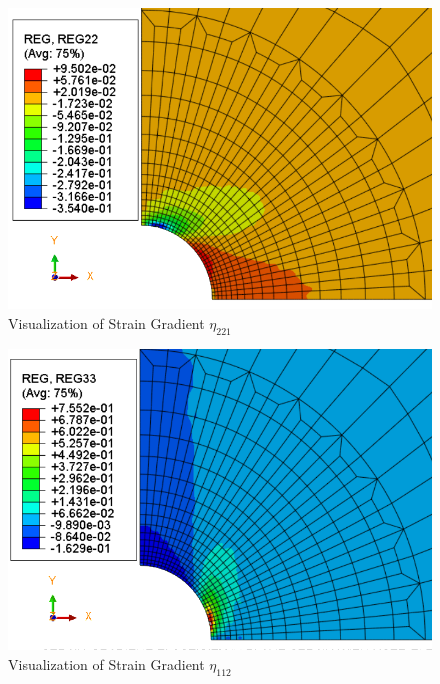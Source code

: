 \documentclass[12pt]{article}
\begin{document}
\begin{figure}[H]
	\begin{center}
		\includegraphics[scale=0.9]{Reg22_crop.png} 
	\end{center}  
   \caption{Visualization of Strain Gradient $\eta_{221} $}
\end{figure}
\begin{figure}[H]
	\begin{center}
		\includegraphics[scale=0.9]{Reg33_crop.png} 
	\end{center}  
   \caption{Visualization of Strain Gradient $\eta_{112} $}
\end{figure}
\end{document}
